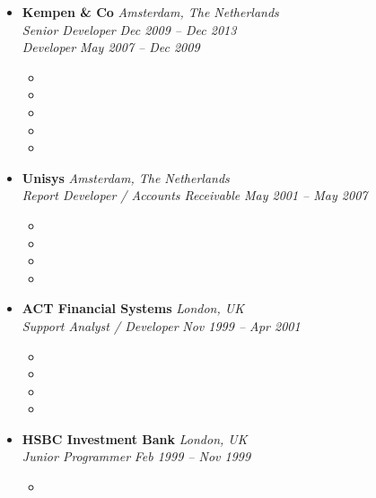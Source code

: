 \documentclass[11pt,a4paper]{article}
\begin{document}
\begin{itemize}[leftmargin=0pt,label={},itemsep=2em]
\item \textbf{Kempen \& Co} \hfill \textit{Amsterdam, The Netherlands}\\[2pt]
\textit{Senior Developer} \hfill \textit{Dec 2009 -- Dec 2013}\\[2pt]
\textit{Developer} \hfill \textit{May 2007 -- Dec 2009}\\[1pt]
\begin{itemize}[leftmargin=*,topsep=0pt,parsep=0pt,partopsep=0pt]
    \item \KempenAgile
    \item \KempenTraining
    \item \KempenIndexing
    \item \KempenTrading
    \item \KempenWorkflow
\end{itemize}

\item \textbf{Unisys} \hfill \textit{Amsterdam, The Netherlands}\\[2pt]
\textit{Report Developer / Accounts Receivable} \hfill \textit{May 2001 -- May 2007}\\[1pt]
\begin{itemize}[leftmargin=*,topsep=0pt,parsep=0pt,partopsep=0pt]
    \item \UnisysReporting
    \item \UnisysEfficiency
    \item \UnisysDecisions
    \item \UnisysPromotion
\end{itemize}

\item \textbf{ACT Financial Systems} \hfill \textit{London, UK}\\[2pt]
\textit{Support Analyst / Developer} \hfill \textit{Nov 1999 -- Apr 2001}\\[1pt]
\begin{itemize}[leftmargin=*,topsep=0pt,parsep=0pt,partopsep=0pt]
    \item \ACTFiscal
    \item \ACTSolutions
    \item \ACTSLA
    \item \ACTCustomers
\end{itemize}

\item \textbf{HSBC Investment Bank} \hfill \textit{London, UK}\\[2pt]
\textit{Junior Programmer} \hfill \textit{Feb 1999 -- Nov 1999}\\[1pt]
\begin{itemize}[leftmargin=*,topsep=0pt,parsep=0pt,partopsep=0pt]
    \item \HSBCProgramming
\end{itemize}


\end{itemize}
\end{document}

